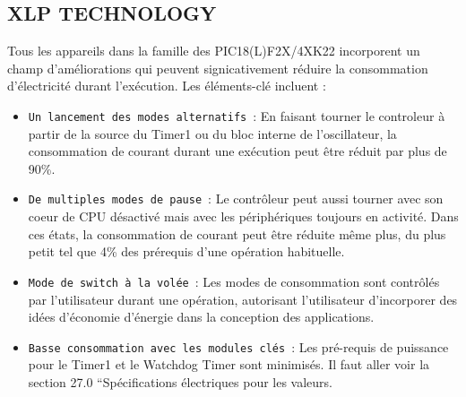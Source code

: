 \documentclass[a4paper, 12pt]{book}
\begin{document}
\subsection{XLP TECHNOLOGY}
Tous les appareils dans la famille des PIC18(L)F2X/4XK22 incorporent un champ d’améliorations qui peuvent signicativement réduire la consommation d’électricité durant l’exécution. 
Les éléments-clé incluent :
\begin{itemize}
\item \texttt{Un lancement des modes alternatifs}~:
En faisant tourner le controleur à partir de la source du Timer1 ou du bloc interne de l’oscillateur, la consommation de courant durant une exécution peut être réduit par plus de 90\%.
\item \texttt{De multiples modes de pause}~:
Le contrôleur peut aussi tourner avec son coeur de CPU désactivé mais avec les périphériques toujours en activité. Dans ces états, la consommation de courant peut être réduite même plus, du plus petit tel que 4\% des prérequis d’une opération habituelle.
\item \texttt{Mode de switch à la volée}~:
Les modes de consommation sont contrôlés par l’utilisateur durant une opération, autorisant l’utilisateur d’incorporer des idées d’économie d’énergie dans la conception des applications.
\item \texttt{Basse consommation avec les modules clés}~:
Les pré-requis de puissance pour le Timer1 et le Watchdog Timer sont minimisés. Il faut aller voir la section 27.0 “Spécifications électriques pour les valeurs.\\
\end{itemize}
\end{document}
